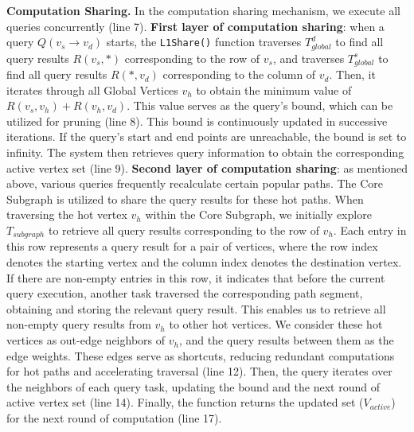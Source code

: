 \documentclass[10pt,journal,compsoc]{IEEEtran}
\begin{document}
{\bf{Computation Sharing.}} 
In the computation sharing mechanism, we execute all queries concurrently (line 7).
{\bf{First layer of computation sharing}}: when a query $Q(v_s\rightarrow v_d)$ starts, the \texttt{L1Share()} function traverses $T_{global}^d$ to find all query results $R{(v_s,*)}$ corresponding to the row of $v_s$, and traverses $T_{global}^s$ to find all query results $R{(*,v_d)}$ corresponding to the column of $v_d$. Then, it iterates through all Global Vertices $v_h$ to obtain the minimum value of $R{(v_s,v_h)}+R{(v_h,v_d)}$.
This value serves as the query's bound, which can be utilized for pruning (line 8). This bound is continuously updated in successive iterations. If the query's start and end points are unreachable, the bound is set to infinity. The system then retrieves query information to obtain the corresponding active vertex set (line 9).
{\bf{Second layer of computation sharing}}: as mentioned above, various queries frequently recalculate certain popular paths. The Core Subgraph is utilized to share the query results for these hot paths. 
When traversing the hot vertex $v_h$ within the Core Subgraph, we initially explore $T_{subgraph}$ to retrieve all query results corresponding to the row of $v_h$. Each entry in this row represents a query result for a pair of vertices, where the row index denotes the starting vertex and the column index denotes the destination vertex. If there are non-empty entries in this row, it indicates that before the current query execution, another task traversed the corresponding path segment, obtaining and storing the relevant query result. This enables us to retrieve all non-empty query results from $v_h$ to other hot vertices. We consider these hot vertices as out-edge neighbors of $v_h$, and the query results between them as the edge weights. These edges serve as shortcuts, reducing redundant computations for hot paths and accelerating traversal (line 12).
Then, the query iterates over the neighbors of each query task, updating the bound and the next round of active vertex set (line 14).
Finally, the function returns the updated set ($V_{{active}}$) for the next round of computation (line 17).
\end{document}
